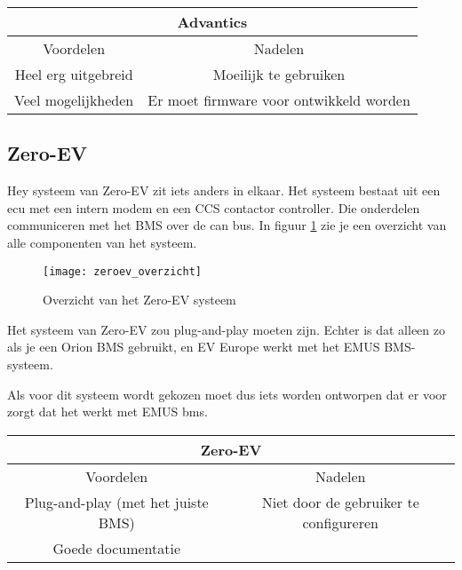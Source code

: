 \begin{table}[h]
    \begin{tabular}{|c|c|}
        \hline
        \multicolumn{2}{c}{Advantics} \\
        \hline
        Voordelen           & Nadelen \\
        \hline
        Heel erg uitgebreid & Moeilijk te gebruiken \\
        Veel mogelijkheden  & Er moet firmware voor ontwikkeld worden \\
        \hline
    \end{tabular}
\end{table}

\subsection{Zero-EV}

Hey systeem van Zero-EV zit iets anders in elkaar. Het systeem bestaat uit een
\ac{ecu} met een intern modem en een CCS contactor controller. Die onderdelen
communiceren met het BMS over de \ac{can} bus. In figuur
\ref{fig:zeroev_overzicht} zie je een overzicht van alle componenten van het
systeem.

\begin{figure}[h]
    \centering
    \texttt{[image: zeroev\_overzicht]}
    \caption{Overzicht van het Zero-EV systeem}
    \label{fig:zeroev_overzicht}
\end{figure}

Het systeem van Zero-EV zou plug-and-play moeten zijn. Echter is dat alleen zo
als je een Orion BMS gebruikt, en EV Europe werkt met het EMUS BMS-systeem.

Als voor dit systeem wordt gekozen moet dus iets worden ontworpen dat er voor
zorgt dat het werkt met EMUS \ac{bms}.

\begin{table}[h]
    \begin{tabular}{|c|c|}
        \hline
        \multicolumn{2}{c}{Zero-EV} \\
        \hline
        Voordelen                          & Nadelen \\
        \hline
        Plug-and-play (met het juiste BMS) & Niet door de gebruiker te configureren \\
        Goede documentatie                 & \\
        \hline
    \end{tabular}
\end{table}

